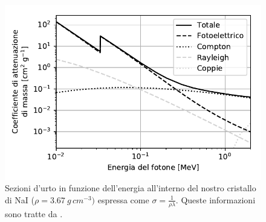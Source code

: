 \begin{figure}[h]
\centering
\includegraphics[width=25 em]{immagini/cross}
\caption{\label{fig:cross}
Sezioni d'urto in funzione dell'energia all'interno del nostro cristallo di NaI ($\rho=\SI{3.67}{g\,cm^{-3}})$ espressa come $\sigma=\frac{1}{\rho\lambda}$. Queste informazioni sono tratte da \cite{cross}.}
\label{sezioni}
\end{figure}
